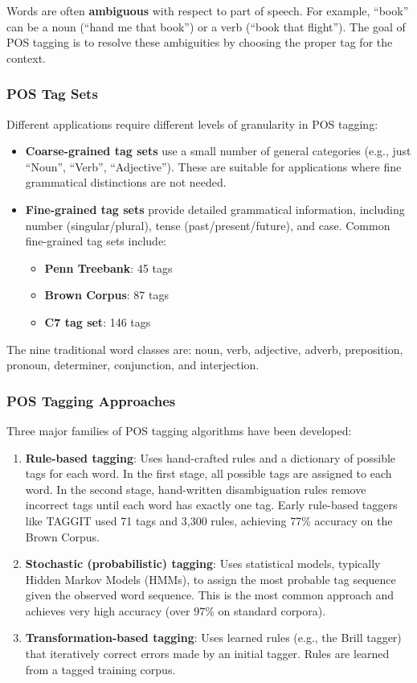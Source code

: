 \documentclass[11pt,a4paper]{article}
\begin{document}
Words are often \textbf{ambiguous} with respect to part of speech. For example, ``book'' can be a noun (``hand me that book'') or a verb (``book that flight''). The goal of POS tagging is to resolve these ambiguities by choosing the proper tag for the context.

\subsubsection{POS Tag Sets}

Different applications require different levels of granularity in POS tagging:
\begin{itemize}
    \item \textbf{Coarse-grained tag sets} use a small number of general categories (e.g., just ``Noun'', ``Verb'', ``Adjective''). These are suitable for applications where fine grammatical distinctions are not needed.
    \item \textbf{Fine-grained tag sets} provide detailed grammatical information, including number (singular/plural), tense (past/present/future), and case. Common fine-grained tag sets include:
    \begin{itemize}
        \item \textbf{Penn Treebank}: 45 tags
        \item \textbf{Brown Corpus}: 87 tags
        \item \textbf{C7 tag set}: 146 tags
    \end{itemize}
\end{itemize}

The nine traditional word classes are: noun, verb, adjective, adverb, preposition, pronoun, determiner, conjunction, and interjection.

\subsubsection{POS Tagging Approaches}

Three major families of POS tagging algorithms have been developed:
\begin{enumerate}
    \item \textbf{Rule-based tagging}: Uses hand-crafted rules and a dictionary of possible tags for each word. In the first stage, all possible tags are assigned to each word. In the second stage, hand-written disambiguation rules remove incorrect tags until each word has exactly one tag. Early rule-based taggers like TAGGIT used 71 tags and 3,300 rules, achieving 77\% accuracy on the Brown Corpus.
    \item \textbf{Stochastic (probabilistic) tagging}: Uses statistical models, typically Hidden Markov Models (HMMs), to assign the most probable tag sequence given the observed word sequence. This is the most common approach and achieves very high accuracy (over 97\% on standard corpora).
    \item \textbf{Transformation-based tagging}: Uses learned rules (e.g., the Brill tagger) that iteratively correct errors made by an initial tagger. Rules are learned from a tagged training corpus.
\end{enumerate}
\end{document}
